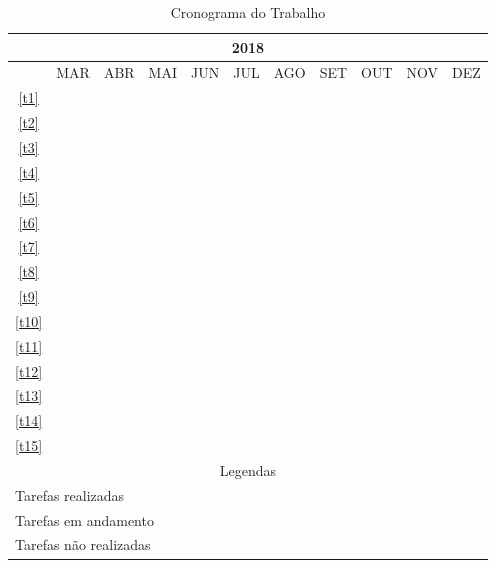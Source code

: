 \begin{table}
\centering
\begin{tabular}{|c|c|c|c|c|c|c|c|c|c|c|}
\hline \multicolumn{11}{|c|}{2018} \\
\hline &MAR&ABR&MAI&JUN&JUL&AGO&SET&OUT&NOV&DEZ \\
\hline \ref{t1} & \cellcolor{green}&&&&&&&&& \\
\hline \ref{t2} & \cellcolor{green}&\cellcolor{green}&&&&&&&& \\
\hline \ref{t3} && \cellcolor{green}&\cellcolor{green}&&&&&&& \\
\hline \ref{t4} && \cellcolor{green}&\cellcolor{green}&&&&&&& \\
\hline \ref{t5} &&& \cellcolor{green}&\cellcolor{green}&&&&&& \\
\hline \ref{t6} && \cellcolor{green}&\cellcolor{green}&\cellcolor{green}&&&&&& \\
\hline \ref{t7} &&&&& \cellcolor{yellow}&\cellcolor{yellow}&&&& \\
\hline \ref{t8} &&&&& \cellcolor{yellow}&\cellcolor{yellow}&&&& \\
\hline \ref{t9} &&&&&& \cellcolor{red}&\cellcolor{red}&&& \\
\hline \ref{t10} &&&&&& \cellcolor{red}&\cellcolor{red}&&& \\
\hline \ref{t11} &&&&&&& \cellcolor{red}&\cellcolor{red}&& \\
\hline \ref{t12} &&&&&&& \cellcolor{red}&\cellcolor{red}&\cellcolor{red}& \\
\hline \ref{t13} &&&&&&& \cellcolor{red}&\cellcolor{red}&\cellcolor{red}& \\
\hline \ref{t14} &&&&&&&& \cellcolor{red}&\cellcolor{red}&\cellcolor{red} \\
\hline \ref{t15} &&&&&&& \cellcolor{red}&\cellcolor{red}&\cellcolor{red}&\cellcolor{red} \\
\hline \multicolumn{11}{|c|}{Legendas} \\
\hline \multicolumn{10}{|l|}{Tarefas realizadas}&\cellcolor{green} \\
\hline \multicolumn{10}{|l|}{Tarefas em andamento}&\cellcolor{yellow} \\
\hline \multicolumn{10}{|l|}{Tarefas não realizadas}&\cellcolor{red} \\
\hline
\end{tabular}
\caption{Cronograma do Trabalho}
\label{table:cronograma}
\end{table}